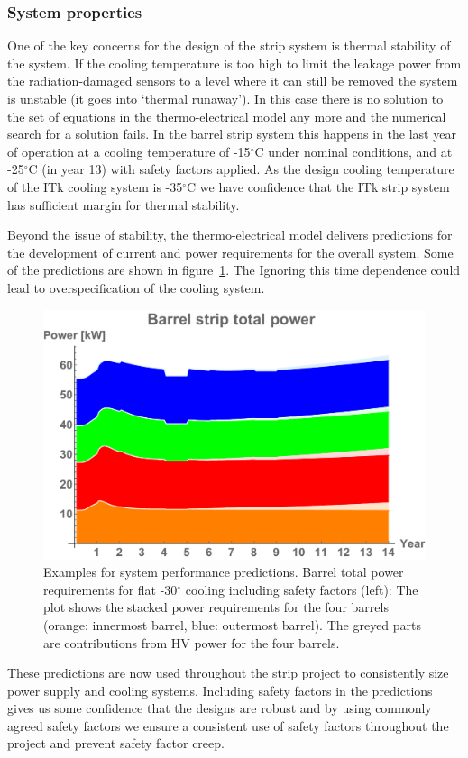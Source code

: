\subsubsection{System properties}
One of the key concerns for the design of the strip system is thermal stability of the system. If the cooling temperature is too high to limit the leakage power from the radiation-damaged sensors to a level where it can still be removed the system is unstable (it goes into `thermal runaway'). In this case there is no solution to the set of equations in the thermo-electrical model any more and the numerical search for a solution fails. In the barrel strip system this happens in the last year of operation at a cooling temperature of -15$^\circ$C under nominal conditions, and at -25$^\circ$C (in year 13) with safety factors applied. As the design cooling temperature of the ITk cooling system is -35$^\circ$C we have confidence that the ITk strip system has sufficient margin for thermal stability.  

Beyond the issue of stability, the thermo-electrical model delivers predictions for the development of current and power requirements for the overall system. Some of the predictions are shown in figure~\ref{fig:systemperformance}. The Ignoring this time dependence could lead to overspecification of the cooling system.

\begin{figure}[ht]
\centering
\includegraphics[width=0.4\linewidth]{figures/Totalbarrelpower-30.pdf}
\caption{Examples for system performance predictions. Barrel total power requirements for flat -30$^\circ$ cooling including safety factors (left): The plot shows the stacked power requirements for the four barrels (orange: innermost barrel, blue: outermost barrel). The greyed parts are contributions from HV power for the four barrels.}
\label{fig:systemperformance}
\end{figure}

These predictions are now used throughout the strip project to consistently size power supply and cooling systems. Including safety factors in the predictions gives us some confidence that the designs are robust and by using commonly agreed safety factors we ensure a consistent use of safety factors throughout the project and prevent safety factor creep.  

